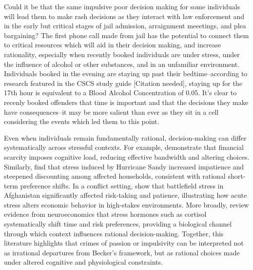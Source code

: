\documentclass[12pt, a4paper]{article}
\begin{document}
Could it be that the same impulsive poor decision making for some individuals will lead them to make rash decisions as they interact with law enforcement and in the early but critical stages of jail admission, arraignment meeetings, and plea bargaining? The first phone call made from jail has the potential to connect them to critical resources which will aid in their decision making, and increase rationality, especially when recently booked individuals are under stress, under the influence of alcohol or other substances, and in an unfamiliar environment. Individuals booked in the evening are staying up past their bedtime--according to research featured in the CSCS study guide [Citation needed], staying up for the 17th hour is equivalent to a Blood Alcohol Concentration of 0.05. It's clear to recenly booked offenders that time is important and that the decisions they make have consequences--it may be more salient than ever as they sit in a cell considering the events which led them to this point. 

Even when individuals remain fundamentally rational, decision-making can differ systematically across stressful contexts. For example, \citet{Mani2013} demonstrate that financial scarcity imposes cognitive load, reducing effective bandwidth and altering choices. Similarly, \citet{Carvalho2016} find that stress induced by Hurricane Sandy increased impatience and steepened discounting among affected households, consistent with rational short-term preference shifts. In a conflict setting, \citet{Callen2014} show that battlefield stress in Afghanistan significantly affected risk-taking and patience, illustrating how acute stress alters economic behavior in high-stakes environments. More broadly, \citet{HaushoferFehr2014} review evidence from neuroeconomics that stress hormones such as cortisol systematically shift time and risk preferences, providing a biological channel through which context influences rational decision-making. Together, this literature highlights that crimes of passion or impulsivity can be interpreted not as irrational departures from Becker’s framework, but as rational choices made under altered cognitive and physiological constraints. 
\end{document}

